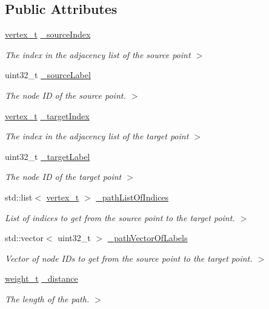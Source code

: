 \subsection*{Public Attributes}
\begin{DoxyCompactItemize}
\item 
\hyperlink{dijkstraPathfinding_8h_af4d7cdf2478501dc15b627a84f3f4073}{vertex\-\_\-t} \hyperlink{classPathDataContainer_a2ba5058e1240bf7b2d5c7cfba9058cde}{\-\_\-source\-Index}
\begin{DoxyCompactList}\small\item\em The index in the adjacency list of the source point $>$ \end{DoxyCompactList}\item 
uint32\-\_\-t \hyperlink{classPathDataContainer_a938627791e643867d3a5a67b92141cbf}{\-\_\-source\-Label}
\begin{DoxyCompactList}\small\item\em The node I\-D of the source point. $>$ \end{DoxyCompactList}\item 
\hyperlink{dijkstraPathfinding_8h_af4d7cdf2478501dc15b627a84f3f4073}{vertex\-\_\-t} \hyperlink{classPathDataContainer_a276bb46806ebf42d7c0f620469f2f2da}{\-\_\-target\-Index}
\begin{DoxyCompactList}\small\item\em The index in the adjacency list of the target point $>$ \end{DoxyCompactList}\item 
uint32\-\_\-t \hyperlink{classPathDataContainer_ad0f623b05a5421f9a81dddc8375d5102}{\-\_\-target\-Label}
\begin{DoxyCompactList}\small\item\em The node I\-D of the target point $>$ \end{DoxyCompactList}\item 
std\-::list$<$ \hyperlink{dijkstraPathfinding_8h_af4d7cdf2478501dc15b627a84f3f4073}{vertex\-\_\-t} $>$ \hyperlink{classPathDataContainer_a4fc598d01fec07280012333ec2ae41a8}{\-\_\-path\-List\-Of\-Indices}
\begin{DoxyCompactList}\small\item\em List of indices to get from the source point to the target point. $>$ \end{DoxyCompactList}\item 
std\-::vector$<$ uint32\-\_\-t $>$ \hyperlink{classPathDataContainer_a295280af08a51cdf16fbba3c106cf35b}{\-\_\-path\-Vector\-Of\-Labels}
\begin{DoxyCompactList}\small\item\em Vector of node I\-Ds to get from the source point to the target point. $>$ \end{DoxyCompactList}\item 
\hyperlink{dijkstraPathfinding_8h_ac7889bf9b3596f63c57011af217212dd}{weight\-\_\-t} \hyperlink{classPathDataContainer_a339ae57ff022c272bb6a98bbdf68105e}{\-\_\-distance}
\begin{DoxyCompactList}\small\item\em The length of the path. $>$ \end{DoxyCompactList}\end{DoxyCompactItemize}


